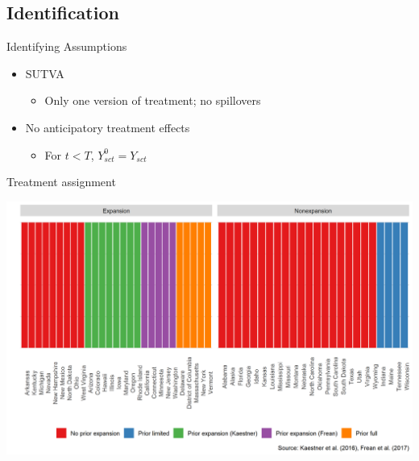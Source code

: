 \documentclass[hyperref={pdfpagelabels=false}]{beamer}
\begin{document}
\subsection{Identification}

\begin{frame}{Identifying Assumptions}

\begin{itemize}
    \item SUTVA \bigskip
    \begin{itemize}
        \item Only one version of treatment; no spillovers \bigskip
    \end{itemize}
    \item No anticipatory treatment effects \bigskip
    \begin{itemize}
        \item For $t < T$, $Y_{sct}^0 = Y_{sct}$ \bigskip
    \end{itemize}
\end{itemize}

\end{frame}

\begin{frame}{Treatment assignment}
    \begin{center}
	\includegraphics[scale=0.5]{01_Plots/expansion-heterogeneity.png}
    \end{center}
\end{frame}
\end{document}

